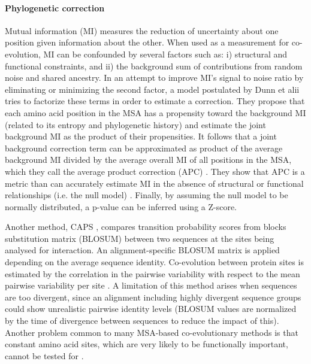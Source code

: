 \paragraph{Phylogenetic correction}
Mutual information (MI) measures the reduction of uncertainty about one position given information about the other.
When used as a measurement for co-evolution, MI can be confounded by several factors such as: 
i) structural and functional constraints, and 
ii) the background sum of contributions from random noise and shared ancestry.
In an attempt to improve MI's signal to noise ratio by eliminating or minimizing the second factor, a model postulated by Dunn et alii \cite{dunn2008mutual} tries to factorize these terms in order to estimate a correction.
They propose that each amino acid position in the MSA has a propensity toward the background MI (related to its entropy and phylogenetic history) and estimate the joint background MI as the product of their propensities.
It follows that a joint background correction term can be approximated as product of the average background MI divided by the average overall MI of all positions in the MSA, which they call the average product correction (APC) \cite{dunn2008mutual}.
They show that APC is a metric than can accurately estimate MI in the absence of structural or functional relationships (i.e. the null model) \cite{dunn2008mutual}.
Finally, by assuming the null model to be normally distributed, a p-value can be inferred using a Z-score.

Another method, CAPS \cite{fares2006novel}, compares transition probability scores from blocks substitution matrix (BLOSUM) between two sequences at the sites being analysed for interaction.
An alignment-specific BLOSUM matrix is applied depending on the average sequence identity.
Co-evolution between protein sites is estimated by the correlation in the pairwise variability with respect to the mean pairwise variability per site \cite{fares2006novel}.
A limitation of this method arises when sequences are too divergent, since an alignment including highly divergent sequence groups could show unrealistic pairwise identity levels (BLOSUM values are normalized by the time of divergence between sequences to reduce the impact of this).
Another problem common to many MSA-based co-evolutionary methods is that constant amino acid sites, which are very likely to be functionally important, cannot be tested for  \cite{fares2006novel}.

